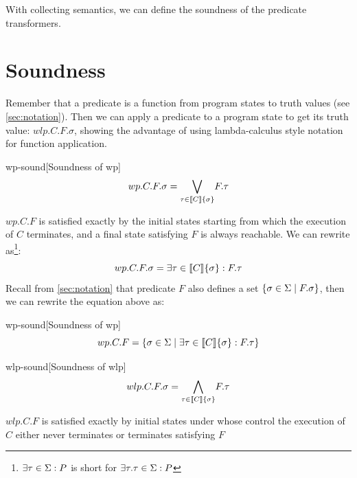 
With collecting semantics, we can define the soundness of the predicate transformers. 

\section{Soundness}\label{sec:sound} 
Remember that a predicate is a function from program states to truth values (see \autoref{sec:notation}). 
Then we can apply a predicate to a program state to get its truth value: $wlp.C.F.\sigma$, showing the advantage of using lambda-calculus style notation for function application. 

\begin{theorem}{wp-sound}[Soundness of wp]~{\normalfont\cite{zhang22}} 
\ \vspace{-1.5mm}  
\[
wp.C.F.\sigma = \underset{\tau\in\sem{C}\{\sigma\}}{\bigvee} F.\tau
\]
\end{theorem}

$wp.C.F$ is satisfied exactly by the initial states starting from which the execution of $C$ terminates, and a final state satisfying $F$ is always reachable.
We can rewrite  as\footnote{$\exists\tau\in\S:P$ is short for $\exists\tau.\tau\in\S:P$}: 
\[wp.C.F.\sigma = \exists \tau\in\sem{C}\{\sigma\}: F.\tau \]
Recall from \autoref{sec:notation} that predicate $F$ also defines a set $\{\sigma\in\S\mid F.\sigma\}$, then we can rewrite the equation above as: 
\begin{corollary}{wp-sound}[Soundness of wp]
  \[wp.C.F = \{\sigma\in\S\mid\exists\tau\in\sem{C}\{\sigma\}:F.\tau\}\]
\end{corollary}

\begin{theorem}{wlp-sound}[Soundness of wlp]~{\normalfont\cite{zhang22, dijkstra90}}
\ \vspace{-1.5mm} 
\[
wlp.C.F.\sigma = \underset{\tau\in\sem{C}\{\sigma\}}{\bigwedge} F.\tau
\]
\end{theorem}
$wlp.C.F$ is satisfied exactly by initial states under whose control the execution of $C$ either never terminates or terminates satisfying $F$

